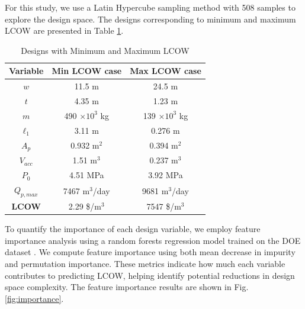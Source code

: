 \documentclass[twocolumn,10pt]{asme2e}
\begin{document}
For this study, we use a Latin Hypercube sampling method with 508 samples to explore the design space. The designs corresponding to minimum and maximum LCOW are presented in Table \ref{tab:doe}.
\begin{table}
    \centering
    \caption{Designs with Minimum and Maximum LCOW}
    \begin{tabular}{|c|c|c|}
        \hline
        \textbf{Variable} & \textbf{Min LCOW case} & \textbf{Max LCOW case} \\
        \hline
        $w$ & 11.5 m & 24.5 m \\
        $t$ & 4.35 m & 1.23 m \\
        $m$ & 490 $\times10^3$ kg & 139 $\times10^3$ kg \\
        $\ell_1$ & 3.11 m & 0.276 m \\
        $A_p$ & 0.932 m$^2$ & 0.394 m$^2$ \\
        $V_{acc}$ & 1.51 m$^3$ & 0.237 m$^3$ \\
        $P_0$ & 4.51 MPa & 3.92 MPa \\
        $Q_{p,max}$ & 7467 m$^3$/day & 9681 m$^3$/day \\
        \hline
        \textbf{LCOW} & 2.29 \$/m$^3$ & 7547 \$/m$^3$ \\
        \hline
    \end{tabular}
    \label{tab:doe}
\end{table}

To quantify the importance of each design variable, we employ feature importance analysis using a random forests regression model trained on the DOE dataset \cite{Rogers2006}. We compute feature importance using both mean decrease in impurity and permutation importance. These metrics indicate how much each variable contributes to predicting LCOW, helping identify potential reductions in design space complexity. The feature importance results are  shown in Fig. \ref{fig:importance}.
\end{document}

